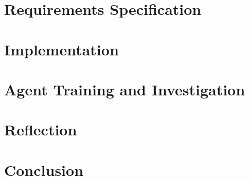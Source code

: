 \documentclass[11pt,a4paper]{article}
\begin{document}
\section{Requirements Specification}

\section{Implementation}

\section{Agent Training and Investigation}

\section{Reflection}

\section{Conclusion}

\medskip



\end{document}
